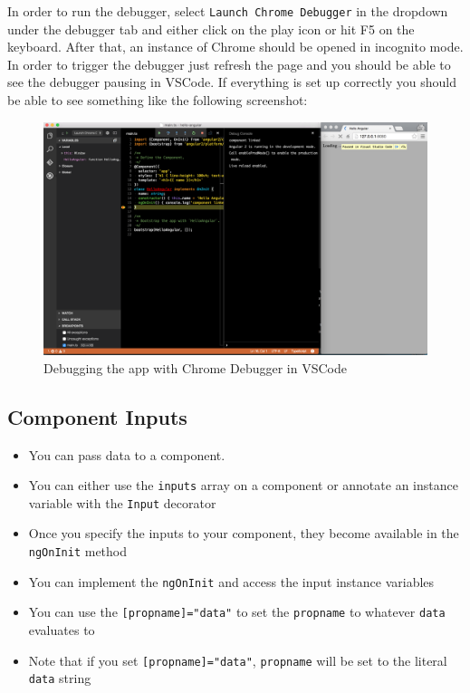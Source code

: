 \documentclass[12pt,]{article}
\providecommand{\tightlist}{%
  \setlength{\itemsep}{0pt}\setlength{\parskip}{0pt}}
\begin{document}
In order to run the debugger, select \texttt{Launch\ Chrome\ Debugger}
in the dropdown under the debugger tab and either click on the play icon
or hit F5 on the keyboard. After that, an instance of Chrome should be
opened in incognito mode. In order to trigger the debugger just refresh
the page and you should be able to see the debugger pausing in VSCode.
If everything is set up correctly you should be able to see something
like the following screenshot:

\begin{figure}[htbp]
\centering
\includegraphics{images/run-debugger.png}
\caption{Debugging the app with Chrome Debugger in VSCode}
\end{figure}

\subsection{Component Inputs}\label{component-inputs}

\begin{itemize}
\tightlist
\item
  You can pass data to a component.
\item
  You can either use the \texttt{inputs} array on a component or
  annotate an instance variable with the \texttt{Input} decorator
\item
  Once you specify the inputs to your component, they become available
  in the \texttt{ngOnInit} method
\item
  You can implement the \texttt{ngOnInit} and access the input instance
  variables
\item
  You can use the \texttt{{[}propname{]}="data"} to set the
  \texttt{propname} to whatever \texttt{data} evaluates to
\item
  Note that if you set
  \texttt{{[}propname{]}="\textquotesingle{}data\textquotesingle{}"},
  \texttt{propname} will be set to the literal \texttt{data} string
\end{itemize}
\end{document}
